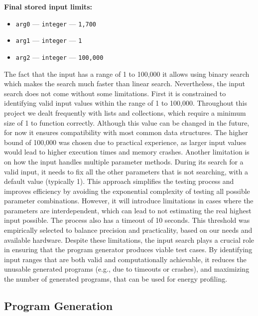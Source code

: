 \begin{tcolorbox}[title=Example: Input Testing Process for \texttt{List.add(index, Element)}, colback=gray!5!white, colframe=gray!75!black, fonttitle=\bfseries, breakable]
\textbf{Final stored input limits:}
\begin{itemize}
    \item \texttt{arg0} — \texttt{integer} — \texttt{1,700}
    \item \texttt{arg1} — \texttt{integer} — \texttt{1}
    \item \texttt{arg2} — \texttt{integer} — \texttt{100,000}
\end{itemize}

\end{tcolorbox}

The fact that the input has a range of 1 to 100,000 it allows using binary search which makes the search much faster than linear search.
Nevertheless, the input search does not come without some limitations. First it is constrained to identifying valid input values within the range of 1 to 100,000. Throughout this project we dealt frequently with lists and collections, which require a minimum size of 1 to function correctly. Although this value can be changed in the future, for now it ensures compatibility with most common data structures. The higher bound of 100,000 was chosen due to practical experience, as larger input values would lead to higher execution times and memory crashes. Another limitation is on how the input handles multiple parameter methods. During its search for a valid input, it needs to fix all the other parameters that is not searching, with a default value (typically 1). This approach simplifies the testing process and improves efficiency by avoiding the exponential complexity of testing all possible parameter combinations. However, it will introduce limitations in cases where the parameters are interdependent, which can lead to not estimating the real highest input possible. The process also has a timeout of 10 seconds. This threshold was empirically selected to balance precision and practicality, based on our needs and available hardware.
Despite these limitations, the input search plays a crucial role in ensuring that the program generator produces viable test cases. By identifying input ranges that are both valid and computationally achievable, it reduces the unusable generated programs (e.g., due to timeouts or crashes), and maximizing the number of generated programs, that can be used for energy profiling.



\subsection{Program Generation} \label{sec:work_stage1_program_generation}

